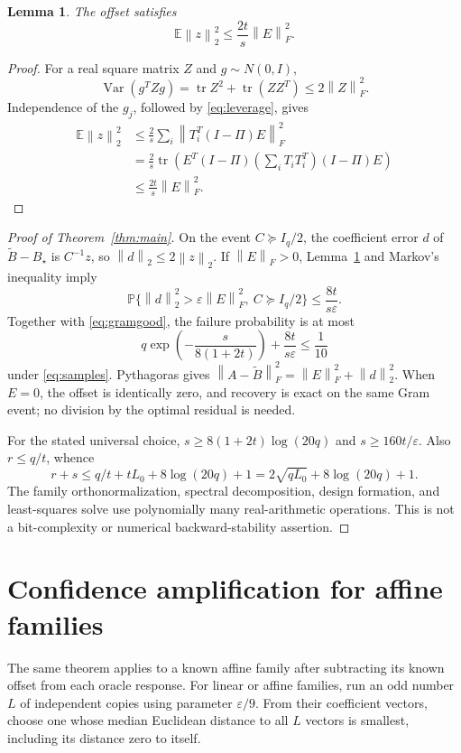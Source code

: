 \documentclass[11pt]{article}
\newtheorem{lemma}[theorem]{Lemma}
\theoremstyle{definition}
\newcommand{\E}{\mathbb E}
\newcommand{\Prob}{\mathbb P}
\newcommand{\tr}{\operatorname{tr}}
\newcommand{\norm}[1]{\left\lVert#1\right\rVert}
\newcommand{\eps}{\varepsilon}
\begin{document}
\begin{lemma}\label{lem:noise}
The offset satisfies
\[
 \E\norm z_2^2\le\frac{2t}{s}\norm E_F^2.
\]
\end{lemma}
\begin{proof}
For a real square matrix $Z$ and $g\sim N(0,I)$,
\[
 \operatorname{Var}(g^TZg)=\tr Z^2+\tr(ZZ^T)\le2\norm Z_F^2.
\]
Independence of the $g_j$, followed by \eqref{eq:leverage}, gives
\begin{align*}
 \E\norm z_2^2
 &\le\frac2s\sum_i\norm{T_i^T(I-\Pi)E}_F^2\\
 &=\frac2s\tr\left(E^T(I-\Pi)
                  \left(\sum_iT_iT_i^T\right)(I-\Pi)E\right)\\
 &\le\frac{2t}{s}\norm E_F^2.
\end{align*}
\end{proof}

\begin{proof}[Proof of Theorem~\ref{thm:main}]
On the event $C\succeq I_q/2$, the coefficient error $d$ of $\widetilde B-B_\star$ is $C^{-1}z$, so $\norm d_2\le2\norm z_2$. If $\norm E_F>0$, Lemma~\ref{lem:noise} and Markov's inequality imply
\[
 \Prob\{\norm d_2^2>\eps\norm E_F^2,\ C\succeq I_q/2\}
 \le\frac{8t}{s\eps}.
\]
Together with \eqref{eq:gramgood}, the failure probability is at most
\[
 q\exp\left(-\frac{s}{8(1+2t)}\right)+\frac{8t}{s\eps}\le\frac1{10}
\]
under \eqref{eq:samples}. Pythagoras gives
$\norm{A-\widetilde B}_F^2=\norm E_F^2+\norm d_2^2$.
When $E=0$, the offset is identically zero, and recovery is exact on the same Gram event; no division by the optimal residual is needed.

For the stated universal choice, $s\ge8(1+2t)\log(20q)$ and $s\ge160t/\eps$. Also $r\le q/t$, whence
\[
 r+s\le q/t+tL_0+8\log(20q)+1
       =2\sqrt{qL_0}+8\log(20q)+1.
\]
The family orthonormalization, spectral decomposition, design formation, and least-squares solve use polynomially many real-arithmetic operations. This is not a bit-complexity or numerical backward-stability assertion.
\end{proof}

\section{Confidence amplification for affine families}
The same theorem applies to a known affine family after subtracting its known offset from each oracle response. For linear or affine families, run an odd number $L$ of independent copies using parameter $\eps/9$. From their coefficient vectors, choose one whose median Euclidean distance to all $L$ vectors is smallest, including its distance zero to itself.
\end{document}
